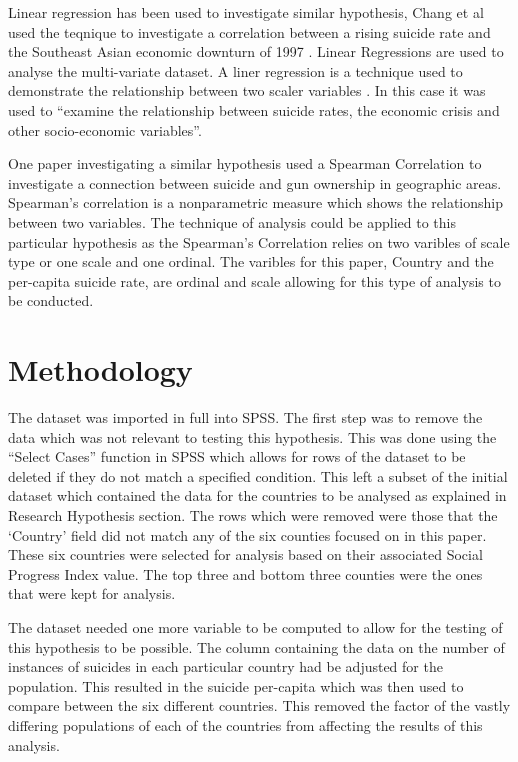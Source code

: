 \documentclass[conference]{IEEEtran}
\begin{document}
Linear regression has been used to investigate similar hypothesis, Chang et al used the teqnique to investigate a 
correlation between a rising suicide rate and the Southeast Asian economic downturn of 1997 \cite{SEAsia_sui}.
Linear Regressions are used to analyse the multi-variate dataset. A liner regression is a technique used to demonstrate the relationship between two scaler variables \cite{stats_models_book}. 
In this case it was used to ``examine the relationship between suicide rates, the economic crisis and other socio-economic variables''\cite{SEAsia_sui}.

One paper investigating a similar hypothesis used a Spearman Correlation to investigate a connection between suicide and gun ownership in geographic areas.
Spearman's correlation is a nonparametric measure which shows the relationship between two variables\cite{gun_sui}.
The technique of analysis could be applied to this particular hypothesis as the Spearman's Correlation relies on two varibles of scale type or one scale and one ordinal.
The varibles for this paper, Country and the per-capita suicide rate, are ordinal and scale allowing for this type of analysis to be conducted.

\section{Methodology}
The dataset was imported in full into SPSS. The first step was to remove the data which was not relevant to testing this hypothesis.
This was done using the ``Select Cases'' function in SPSS which allows for rows of the dataset to be deleted if they do not match a specified condition.
This left a subset of the initial dataset which contained the data for the countries to be analysed as explained in Research Hypothesis section.
The rows which were removed were those that the `Country' field did not match any of the six counties focused on in this paper.
These six countries were selected for analysis based on their associated Social Progress Index value. The top three and bottom three counties were the ones that were kept for analysis.

The dataset needed one more variable to be computed to allow for the testing of this hypothesis to be possible.
The column containing the data on the number of instances of suicides in each particular country had be adjusted for the population.
This resulted in the suicide per-capita which was then used to compare between the six different countries.
This removed the factor of the vastly differing populations of each of the countries from affecting the results of this analysis.
\end{document}

